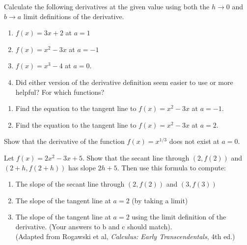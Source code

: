\documentclass{ximera}
\begin{document}
\begin{exercise}
Calculate the following derivatives at the given value using both the $h\rightarrow 0$ and $b\rightarrow a$ limit definitions of the derivative.\\
    \begin{enumerate}
        \item $f(x)=3x+2$ at $a=1$\\
        
        \item $f(x)=x^2-3x$ at $a=-1$\\
        
        \item $f(x)=x^3-4$ at $a=0$.\\
        
        \item Did either version of the derivative definition seem easier to use or more helpful?  For which functions? 
    \end{enumerate}

    \end{exercise}

    \begin{exercise} 
        \begin{enumerate}
            \item Find the equation to the tangent line to $f(x)=x^2-3x$ at $a=-1$.
            \item Find the equation to the tangent line to $f(x)=x^2-3x$ at $a=2$.
        \end{enumerate}
    \end{exercise}

    \begin{exercise}
        Show that the derivative of the function $f(x)=x^{1/3}$ does not exist at $a=0$.
    \end{exercise}
   

    \begin{exercise}
    
    Let $f(x)=2x^2-3x+5$. Show that the secant line through $(2,f(2))$  and $(2+h, f(2+h))$ has slope $2h+5$. Then use this formula to compute:
    \begin{enumerate}
        \item The slope of the secant line through $(2,f(2))$  and $(3,f(3))$ \\
        
         \item The slope of the tangent line at $a=2$  (by taking a limit)
        
         \item The slope of the tangent line at $a=2$ using the limit definition of the derivative. (Your answers to b and c should match).\\
         
         (Adapted from Rogawski et al, \textit{Calculus: Early Transcendentals}, 4th ed.)
    \end{enumerate}
    \end{exercise} 
\end{document}
